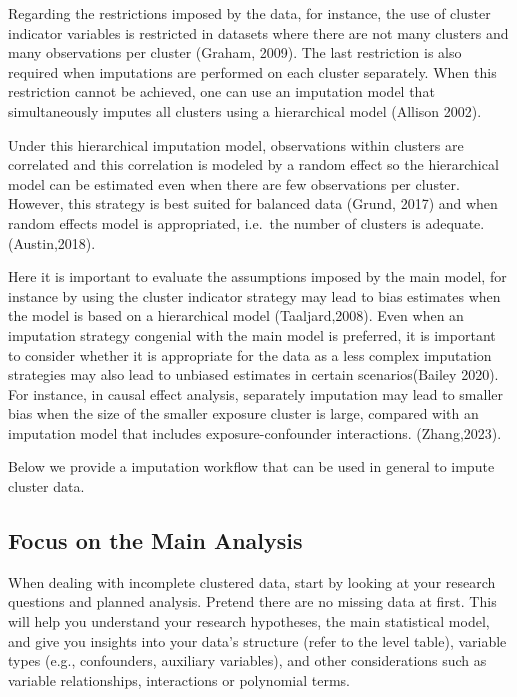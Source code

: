 \documentclass[
  article]{jss}
\begin{document}
Regarding the restrictions imposed by the data, for instance, the use of
cluster indicator variables is restricted in datasets where there are
not many clusters and many observations per cluster (Graham, 2009). The
last restriction is also required when imputations are performed on each
cluster separately. When this restriction cannot be achieved, one can
use an imputation model that simultaneously imputes all clusters using a
hierarchical model (Allison 2002).

Under this hierarchical imputation model, observations within clusters
are correlated and this correlation is modeled by a random effect so the
hierarchical model can be estimated even when there are few observations
per cluster. However, this strategy is best suited for balanced data
(Grund, 2017) and when random effects model is appropriated, i.e.~the
number of clusters is adequate. (Austin,2018).

Here it is important to evaluate the assumptions imposed by the main
model, for instance by using the cluster indicator strategy may lead to
bias estimates when the model is based on a hierarchical model
(Taaljard,2008). Even when an imputation strategy congenial with the
main model is preferred, it is important to consider whether it is
appropriate for the data as a less complex imputation strategies may
also lead to unbiased estimates in certain scenarios(Bailey 2020). For
instance, in causal effect analysis, separately imputation may lead to
smaller bias when the size of the smaller exposure cluster is large,
compared with an imputation model that includes exposure-confounder
interactions. (Zhang,2023).

Below we provide a imputation workflow that can be used in general to
impute cluster data.

\hypertarget{focus-on-the-main-analysis}{%
\subsection{Focus on the Main
Analysis}\label{focus-on-the-main-analysis}}

When dealing with incomplete clustered data, start by looking at your
research questions and planned analysis. Pretend there are no missing
data at first. This will help you understand your research hypotheses,
the main statistical model, and give you insights into your data's
structure (refer to the level table), variable types (e.g., confounders,
auxiliary variables), and other considerations such as variable
relationships, interactions or polynomial terms.
\end{document}
